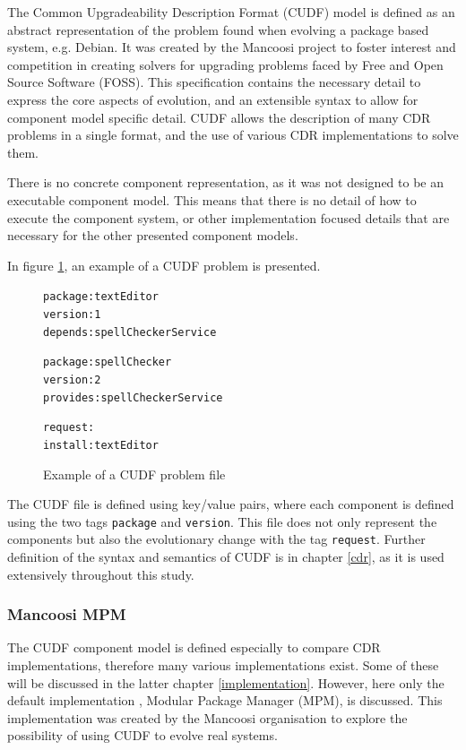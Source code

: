 The Common Upgradeability Description Format (CUDF) model is defined as an abstract representation of the problem found when evolving a package based system, e.g. Debian.
It was created by the Mancoosi project to foster interest and competition in creating solvers for upgrading problems faced by Free and Open Source Software (FOSS).
This specification contains the necessary detail to express the core aspects of evolution, and an extensible syntax to allow for component model specific detail. 
CUDF allows the description of many CDR problems in a single format, and the use of various CDR implementations to solve them. 

There is no concrete component representation, as it was not designed to be an executable component model.
This means that there is no detail of how to execute the component system, or other implementation focused details that are necessary for the other presented component models.

In figure \ref{CUDFmetadata}, an example of a CUDF problem is presented.

\begin{figure}[htp] 
\begin{center}
\begin{alltt}
package: textEditor
version: 1
depends: spellCheckerService

package: spellChecker
version: 2
provides: spellCheckerService

request:
install:textEditor

\end{alltt}
  \caption[CUDF meta-data file]{Example of a CUDF problem file}
  \label{CUDFmetadata}
\end{center}
\end{figure}

The CUDF file is defined using key/value pairs, where each component is defined using the two tags \verb+package+ and \verb+version+.
This file does not only represent the components but also the evolutionary change with the tag \verb+request+.
Further definition of the syntax and semantics of CUDF is in chapter \ref{cdr}, as it is used extensively throughout this study.

\subsubsection{Mancoosi MPM}
The CUDF component model is defined especially to compare CDR implementations, therefore many various implementations exist.
Some of these will be discussed in the latter chapter \ref{implementation}.
However, here only the default implementation , Modular Package Manager \citep{abate2011} (MPM), is discussed.
This implementation was created by the Mancoosi organisation to explore the possibility of using CUDF to evolve real systems.

